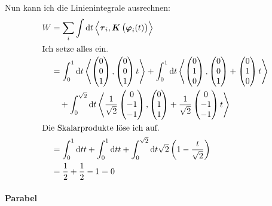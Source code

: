 \documentclass[11pt, ngerman]{article}
\newcommand{\half}{\frac 12}
\newcommand{\inner}[2]{\left\langle #1, #2 \right\rangle}
\renewcommand{\vec}[1]{\boldsymbol{#1}}
\begin{document}
Nun kann ich die Linienintegrale ausrechnen:
\begin{align*}
	W &=
	\sum_i \int \dif t \inner{\vec \tau_i}{\vec K \del{\vec\varphi_i(t)}} \\
	\intertext{Ich setze alles ein.}
	&=
	\int_0^1 \dif t \inner{\begin{pmatrix}
			0 \\ 0 \\ 1
	\end{pmatrix}}{\begin{pmatrix}
			0 \\ 0 \\ 1
	\end{pmatrix} t}
	+
	\int_0^1 \dif t \inner{\begin{pmatrix}
			0 \\ 1 \\ 0
	\end{pmatrix}}{\begin{pmatrix}
			0 \\ 0 \\ 1
		\end{pmatrix} + \begin{pmatrix}
			0 \\ 1 \\ 0
	\end{pmatrix} t} \\
	&\quad+
	\int_0^{\sqrt{2}} \dif t \inner{\frac 1{\sqrt{2}} \begin{pmatrix}
		0 \\ -1 \\ -1 \end{pmatrix}}{\begin{pmatrix}
				0 \\ 1 \\ 1
			\end{pmatrix} + \frac{1}{\sqrt{2}} \begin{pmatrix}
				0 \\ -1 \\ -1
		\end{pmatrix} t} \\
		\intertext{Die Skalarprodukte löse ich auf.}
		&= \int_0^1 \dif t t
		+\int_0^1 \dif t t
		+\int_0^{\sqrt{2}} \dif t \sqrt{2} \del{1-\frac t{\sqrt{2}}} \\
		&= \half + \half -1 = 0
	\end{align*}

	\paragraph{Parabel}
\end{document}
